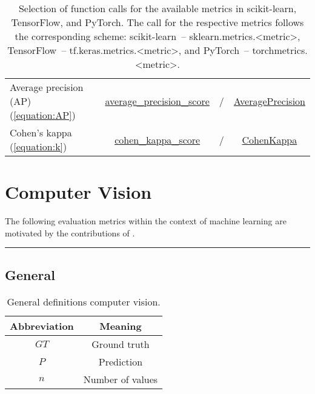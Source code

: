 \documentclass{article}
\begin{document}
\begin{table}[H]
{\begin{tabular}{|l|c|c|c|}
		Average precision (AP) (\ref{equation:AP})
		&
		\href{https://scikit-learn.org/stable/modules/generated/sklearn.metrics.average_precision_score.html\#sklearn.metrics.average_precision_score}{average\_precision\_score}
		&
		/
		&
		\href{https://torchmetrics.readthedocs.io/en/latest/classification/average_precision.html}{AveragePrecision}
		\\

		Cohen's kappa (\ref{equation:k})
		&
		\href{https://scikit-learn.org/stable/modules/generated/sklearn.metrics.cohen_kappa_score.html\#sklearn.metrics.cohen_kappa_score}{cohen\_kappa\_score}
		&
		/
		&
		\href{https://torchmetrics.readthedocs.io/en/latest/classification/cohen_kappa.html}{CohenKappa}
		\\

		\hline
	\end{tabular}}

	\caption{Selection of function calls for the available metrics in scikit-learn, TensorFlow, and PyTorch. The call for the respective metrics follows the corresponding scheme: scikit-learn~-- sklearn.metrics.<metric>, TensorFlow~-- tf.keras.metrics.<metric>, and PyTorch~-- torchmetrics.<metric>.}
	\label{table:ML_functions}
\end{table}




\clearpage




\section{Computer Vision}

The following evaluation metrics within the context of machine learning are motivated by the contributions of \cite{wang2003multiscale, hore2010image}.

\vspace{1cm}
\hrule




\subsection*{General}

\begin{table}[H]
	\centering

	\begin{tabular}{|c|c|}
		\hline
		Abbreviation & Meaning \\
		\hline
		\hline
		$\textit{GT}$ & Ground truth     \\
		$P$           & Prediction       \\
		$n$           & Number of values \\
		\hline
	\end{tabular}

	\caption{General definitions computer vision.}
	\label{table:CV_general}
\end{table}
\end{document}
